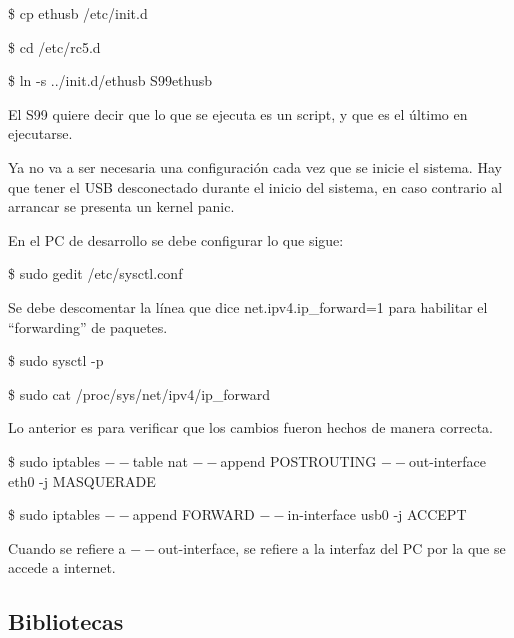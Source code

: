 \bigskip
\centerline{\$ cp ethusb /etc/init.d}

\centerline{\$ cd /etc/rc5.d}

\centerline{\$ ln -s ../init.d/ethusb S99ethusb}

El S99 quiere decir que lo que se ejecuta es un script, y que es el último en ejecutarse.

\bigskip
Ya no va a ser necesaria una configuración cada vez que se inicie el sistema. 
Hay que tener el USB desconectado durante el inicio del sistema, en caso contrario al arrancar se presenta un kernel panic.

\bigskip
{}

\bigskip
En el PC de desarrollo se debe configurar lo que sigue:

\bigskip
\centerline{\$ sudo gedit /etc/sysctl.conf}

Se debe descomentar la línea que dice net.ipv4.ip\_forward=1 para habilitar el “forwarding” de paquetes.

\bigskip
\centerline{\$ sudo sysctl -p}

\centerline{\$ sudo cat /proc/sys/net/ipv4/ip\_forward}

Lo anterior es para verificar que los cambios fueron hechos de manera correcta.

\bigskip
\centerline{\$ sudo iptables $--$table nat $--$append POSTROUTING $--$out-interface eth0 -j  MASQUERADE}

\centerline{\$ sudo iptables $--$append FORWARD $--$in-interface usb0 -j ACCEPT}

Cuando se refiere a $--$out-interface, se refiere a la interfaz del PC por la que se accede a internet.


\subsection{Bibliotecas}


